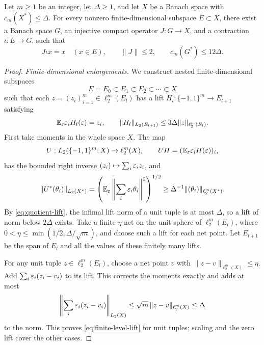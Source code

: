 \begin{lemma}
\label{lem:compact-domain}
Let \(m\ge1\) be an integer, let \(\Delta\ge1\), and let \(X\) be
a Banach space with \(c_m(X^*)\le\Delta\).
For every nonzero finite-dimensional subspace \(E\subset X\), there
exist a Banach space \(G\), an injective compact operator \(J:G\to X\),
and a contraction \(\iota:E\to G\), such that
\begin{equation}\label{eq:compact-domain}
J\iota x=x\quad(x\in E),\qquad
\|J\|\le2,\qquad c_m(G^*)\le12\Delta.
\end{equation}
\end{lemma}
\begin{proof}
\textit{Finite-dimensional enlargements.}
We construct nested finite-dimensional subspaces
\[
E=E_0\subset E_1\subset E_2\subset\cdots\subset X
\]
such that each \(z=(z_i)_{i=1}^m\in\ell_2^m(E_l)\) has a lift
\(H_l:\{-1,1\}^m\to E_{l+1}\) satisfying
\begin{equation}\label{eq:finite-level-lift}
\mathbb E_\varepsilon\varepsilon_iH_l(\varepsilon)=z_i,\qquad
\|H_l\|_{L_2(E_{l+1})}\le3\Delta\|z\|_{\ell_2^m(E_l)}.
\end{equation}
First take moments in the whole space \(X\). The map
\[
U:L_2(\{-1,1\}^m;X)\to\ell_2^m(X),\qquad
UH=(\mathbb E_\varepsilon\varepsilon_iH(\varepsilon))_i,
\]
has the bounded right inverse
\((z_i)\mapsto\sum_i\varepsilon_i z_i\), and
\[
\|U^*(\theta_i)\|_{L_2(X^*)}
=\left(\mathbb E_\varepsilon\left\|\sum_i\varepsilon_i\theta_i\right\|^2\right)^{1/2}
\ge\Delta^{-1}\|(\theta_i)\|_{\ell_2^m(X^*)}.
\]
By \eqref{eq:quotient-lift}, the infimal lift norm of a unit tuple
is at most \(\Delta\), so a lift of norm below \(2\Delta\) exists.
Take a finite \(\eta\)-net on the unit sphere of \(\ell_2^m(E_l)\),
where \(0<\eta\le\min(1/2,\Delta/\sqrt m)\), and choose such a lift
for each net point. Let \(E_{l+1}\) be the span of \(E_l\) and all
the values of these finitely many lifts.

For any unit tuple \(z\in\ell_2^m(E_l)\), choose a net point \(v\)
with \(\|z-v\|_{\ell_2^m(X)}\le\eta\). Add
\(\sum_i\varepsilon_i(z_i-v_i)\) to its lift. This corrects the moments
exactly and adds at most
\[
\left\|\sum_i\varepsilon_i(z_i-v_i)\right\|_{L_2(X)}
\le\sqrt m\,\|z-v\|_{\ell_2^m(X)}\le\Delta
\]
to the norm. This proves \eqref{eq:finite-level-lift} for unit
tuples; scaling and the zero lift cover the other cases.


\end{proof}
